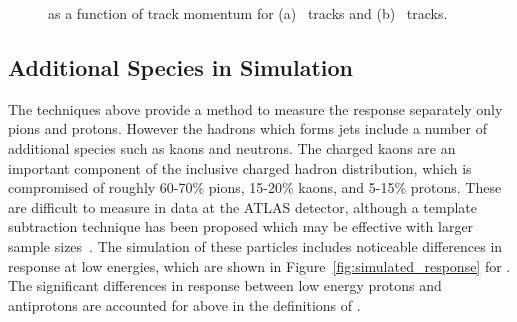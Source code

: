 \begin{figure}[h]
\centering
{}
\caption{\epcor as a function of track momentum for (a) \pip\ tracks and (b) \pim\ tracks.}
\label{fig-epcor_pim}
\end{figure}

\subsection{Additional Species in Simulation}

The techniques above provide a method to measure the response separately only pions and protons. 
However the hadrons which forms jets include a number of additional species such as kaons and neutrons. 
The charged kaons are an important component of the inclusive charged hadron distribution, which is compromised of roughly 60-70\% pions, 15-20\% kaons, and 5-15\% protons.
These are difficult to measure in data at the ATLAS detector, although a template subtraction technique has been proposed which may be effective with larger sample sizes~\cite{PERF-2015-05}.
The simulation of these particles includes noticeable differences in response at low energies, which are shown in Figure~\ref{fig:simulated_response} for \FTFP.
The significant differences in response between low energy protons and antiprotons are accounted for above in the definitions of \Ea. 


